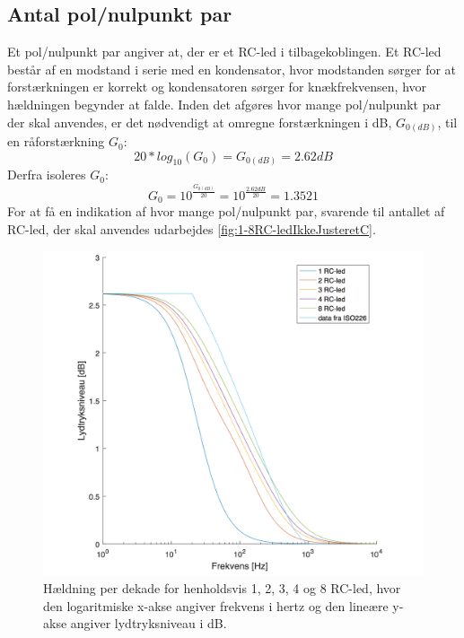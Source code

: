 \subsection{Antal pol/nulpunkt par}
\label{AntalPol_Nulpunktpar}
%
Et pol/nulpunkt par angiver at, der er et RC-led i tilbagekoblingen. Et RC-led består af en modstand i serie med en kondensator, hvor modstanden sørger for at forstærkningen er korrekt og kondensatoren sørger for knækfrekvensen, hvor hældningen begynder at falde.
Inden det afgøres hvor mange pol/nulpunkt par der skal anvendes, er det nødvendigt at omregne forstærkningen i dB, $G_{0(dB)}$, til en råforstærkning $G_0$:
%
\begin{equation}
	20*log_{10}(G_0) = G_{0(dB)} = 2.62dB
\end{equation}
%
Derfra isoleres $G_0$:
%
\begin{equation}
	G_0 = 10^{\frac{G_{0(dB)}}{20}} = 10^{\frac{2.62dB}{20}} = 1.3521
	\label{equ:Gain}
\end{equation}
%
For at få en indikation af hvor mange pol/nulpunkt par, svarende til antallet af RC-led, der skal anvendes udarbejdes \autoref{fig:1-8RC-ledIkkeJusteretC}.
%
\begin{figure}[H]
	\centering
	\includegraphics[resolution=300,width=\textwidth]{Figure/DesignAfFilter/1,2,3,4,8RC-ledGain2,62SHORT.pdf}
	\caption{Hældning per dekade for henholdsvis 1, 2, 3, 4 og 8 RC-led, hvor den logaritmiske x-akse angiver frekvens i hertz og den lineære y-akse angiver lydtryksniveau i dB.}
	\label{fig:1-8RC-ledIkkeJusteretC}
\end{figure}
